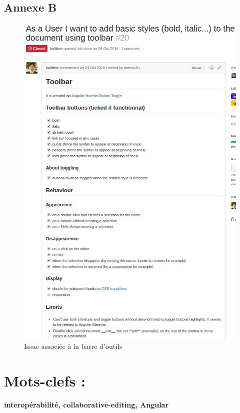 \documentclass[12pt]{article}
\begin{document}
\newpage
\subsection*{Annexe B}
\begin{figure}[H]
\centering
\includegraphics[scale=0.75]{gallery/issue.jpg}
\caption[nom dans le sommaire]{Issue associée à la barre d'outils}
\label{fig:gallery2}
\end{figure}

\newpage
\section*{Mots-clefs :}
\textbf{interopérabilité, collaborative-editing, Angular}
\end{document}
